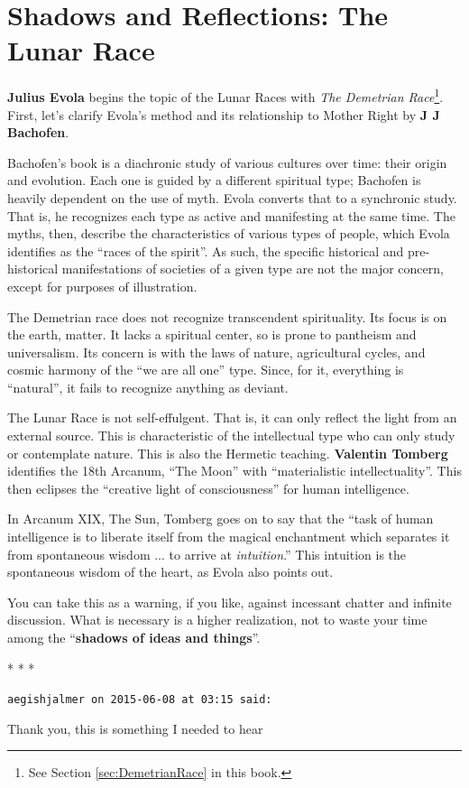 \section{Shadows and Reflections: The Lunar Race}

\textbf{Julius Evola} begins the topic of the Lunar Races with \textit{The Demetrian Race}\footnote{See Section \ref{sec:DemetrianRace} in this book.}. First, let's clarify Evola's method and its relationship to Mother Right by \textbf{J J Bachofen}.

Bachofen's book is a diachronic study of various cultures over time: their origin and evolution. Each one is guided by a different spiritual type; Bachofen is heavily dependent on the use of myth. Evola converts that to a synchronic study. That is, he recognizes each type as active and manifesting at the same time. The myths, then, describe the characteristics of various types of people, which Evola identifies as the ``races of the spirit''. As such, the specific historical and pre-historical manifestations of societies of a given type are not the major concern, except for purposes of illustration.

The Demetrian race does not recognize transcendent spirituality. Its focus is on the earth, matter. It lacks a spiritual center, so is prone to pantheism and universalism. Its concern is with the laws of nature, agricultural cycles, and cosmic harmony of the ``we are all one'' type. Since, for it, everything is ``natural'', it fails to recognize anything as deviant.

The Lunar Race is not self-effulgent. That is, it can only reflect the light from an external source. This is characteristic of the intellectual type who can only study or contemplate nature. This is also the Hermetic teaching. \textbf{Valentin Tomberg} identifies the 18th Arcanum, ``The Moon'' with ``materialistic intellectuality''. This then eclipses the ``creative light of consciousness'' for human intelligence.

In Arcanum XIX, The Sun, Tomberg goes on to say that the ``task of human intelligence is to liberate itself from the magical enchantment which separates it from spontaneous wisdom ... to arrive at
\emph{intuition}.'' This intuition is the spontaneous wisdom of the heart, as Evola also points out.

You can take this as a warning, if you like, against incessant chatter and infinite discussion. What is necessary is a higher realization, not to waste your time among the ``\textbf{shadows of ideas and things}''.



\begin{center}* * *\end{center}

\begin{footnotesize}
\begin{sffamily}
\texttt{aegishjalmer on 2015-06-08 at 03:15 said:}

Thank you, this is something I needed to hear

\end{sffamily}
\end{footnotesize}

